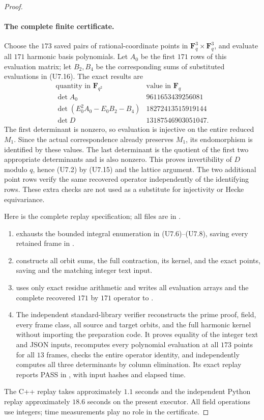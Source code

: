 \documentclass[11pt,a4paper]{article}
\theoremstyle{definition}
\begin{document}
\begin{proof}
\paragraph{The complete finite certificate.}
Choose the $173$ saved pairs of rational-coordinate points in
$\mathbf F_q^3\times\mathbf F_q^3$, and evaluate all $171$
harmonic basis polynomials. Let $A_0$ be the first $171$ rows of
this evaluation matrix; let $B_2,B_4$ be the corresponding sums
of substituted evaluations in (U7.16). The exact results are
\[
 \begin{array}{c|r}
 \text{quantity in }\mathbf F_{q^2}&\text{value in }\mathbf F_q\\ \hline
 \det A_0&9611653439256081\\
 \det(E_0^2A_0-E_0B_2-B_4)&18272413515919144\\
 \det D&13187546903051047.
 \end{array}
 \tag{U7.17}
\]
The first determinant is nonzero, so evaluation is injective on
the entire reduced $M_1$. Since the actual correspondence already
preserves $M_1$, its endomorphism is identified by these values.
The last determinant is the quotient of the first two appropriate
determinants and is also nonzero. This proves invertibility of
$D$ modulo $q$, hence (U7.2) by (U7.15) and the lattice argument.
The two additional point rows verify the same recovered operator
independently of the identifying rows. These extra checks are not
used as a substitute for injectivity or Hecke equivariance.

Here is the complete replay specification; all files are in
.
\begin{enumerate}
\item {} exhausts the bounded integral
      enumeration in (U7.6)--(U7.8), saving every retained frame
      in .
\item {} constructs all orbit sums, the full
      contraction, its kernel, and the exact points, saving
       and the matching integer text input.
\item {} uses only exact residue arithmetic
      and writes all evaluation arrays and the complete recovered
      $171$ by $171$ operator to .
\item The independent standard-library verifier
       reconstructs the prime proof, field,
      every frame class, all source and target orbits, and the full
      harmonic kernel without importing the preparation code. It
      proves equality of the integer text and JSON inputs,
      recomputes every polynomial evaluation at all $173$ points
      for all $13$ frames, checks the entire operator identity,
      and independently computes all three determinants by
      column elimination. Its exact replay reports PASS in
      , with input hashes and elapsed time.
\end{enumerate}
The C++ replay takes approximately $1.1$ seconds and the independent
Python replay approximately $18.6$ seconds on the present executor.
All field operations use integers; time measurements play no role
in the certificate.


\end{proof}
\end{document}
